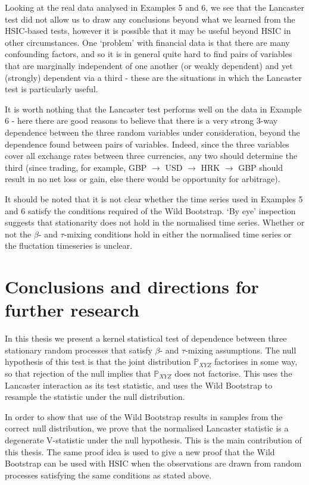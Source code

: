 \documentclass[12pt]{article}
\numberwithin{claim}{section}
\numberwithin{lemma}{section}
\numberwithin{theorem}{section}
\begin{document}
Looking at the real data analysed in Examples 5 and 6, we see that the Lancaster test did not allow us to draw any conclusions beyond what we learned from the HSIC-based tests, however it is possible that it may be useful beyond HSIC in other circumstances. One `problem' with financial data is that there are many confounding factors, and so it is in general quite hard to find pairs of variables that are marginally independent of one another (or weakly dependent) and yet (strongly) dependent via a third - these are the situations in which the Lancaster test is particularly useful. 

It is worth nothing that the Lancaster test performs well on the data in Example 6 - here there are good reasons to believe that there is a very strong 3-way dependence between the three random variables under consideration, beyond the dependence found between pairs of variables. Indeed, since the three variables cover all exchange rates between three currencies, any two should determine the third (since trading, for example, GBP $\longrightarrow$ USD  $\longrightarrow$ HRK  $\longrightarrow$ GBP should result in no net loss or gain, else there would be opportunity for arbitrage).

It should be noted that it is not clear whether the time series used in Examples 5 and 6 satisfy the conditions required of the Wild Bootstrap. `By eye' inspection suggests that stationarity does not hold in the normalised time series. Whether or not the $\beta$- and $\tau$-mixing conditions hold in either the normalised time series or the fluctation timeseries is unclear.

\newpage
\section{Conclusions and directions for further research}

In this thesis we present a kernel statistical test of dependence between three stationary random processes that satisfy $\beta$- and $\tau$-mixing assumptions. The null hypothesis of this test is that the joint distribution $\mathbb{P}_{XYZ}$ factorises in some way, so that rejection of the null implies that $\mathbb{P}_{XYZ}$ does not factorise. This uses the Lancaster interaction as its test statistic, and uses the Wild Bootstrap to resample the statistic under the null distribution. 

In order to show that use of the Wild Bootstrap results in samples from the correct null distribution, we prove that the normalised Lancaster statistic is a degenerate V-statistic under the null hypothesis. This is the main contribution of this thesis. The same proof idea is used to give a new proof that the Wild Bootstrap can be used with HSIC when the observations are drawn from random processes satisfying the same conditions as stated above.
\end{document}
